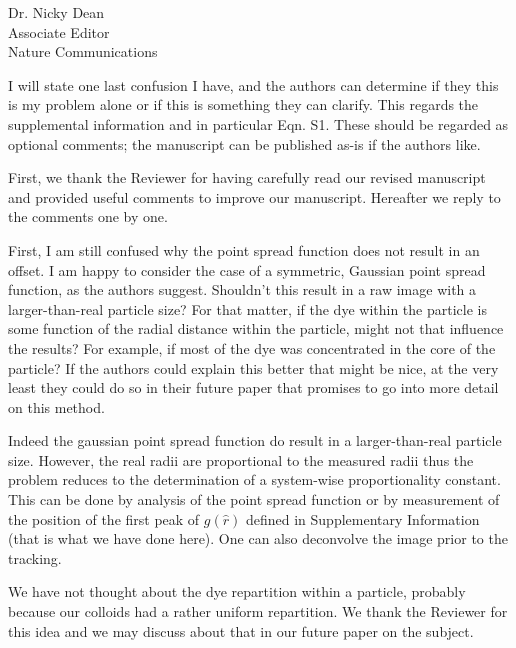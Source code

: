 \documentclass[a4paper, rebuttal, parskip=true, firsthead=false, fromemail=true, foldmarks=false]{scrlttr2}
\begin{document}
\begin{letter}{Dr. Nicky Dean\\
Associate Editor\\
Nature Communications}
\begin{quotationi}
I will state one last confusion I have, and the authors can determine if they this is my problem alone or if this is something they can clarify. This regards the supplemental information and in particular Eqn. S1. These should be regarded as optional comments; the manuscript can be published as-is if the authors like.
\end{quotationi}

First, we thank the Reviewer for having carefully read our revised manuscript and provided useful comments to improve our manuscript. Hereafter we reply to the comments one by one.

\begin{quotationi}
First, I am still confused why the point spread function does not result in an offset. I am happy to consider the case of a symmetric, Gaussian point spread function, as the authors suggest. Shouldn't this result in a raw image with a larger-than-real particle size? For that matter, if the dye within the particle is some function of the radial distance within the particle, might not that influence the results? For example, if most of the dye was concentrated in the core of the particle? If the authors could explain this better that might be nice, at the very least they could do so in their future paper that promises to go into more detail on this method.
\end{quotationi}

Indeed the gaussian point spread function do result in a larger-than-real particle size. However, the real radii are proportional to the measured radii thus the problem reduces to the determination of a system-wise proportionality constant. This can be done by analysis of the point spread function or by measurement of the position of the first peak of $g(\hat{r})$ defined in Supplementary Information (that is what we have done here). One can also deconvolve the image prior to the tracking.

We have not thought about the dye repartition within a particle, probably because our colloids had a rather uniform repartition. We thank the Reviewer for this idea and we may discuss about that in our future paper on the subject.


\end{letter}
\end{document}
